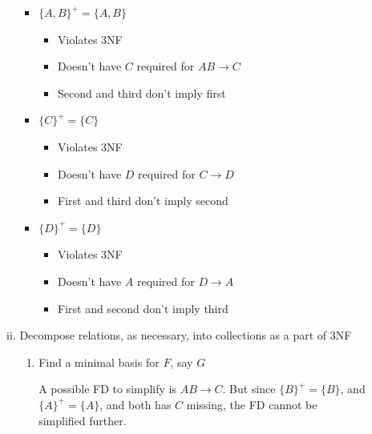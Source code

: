 \documentclass[12pt]{article}
\begin{document}
\begin{enumerate}[1.]
\begin{enumerate}[a)]
\begin{enumerate}[i)]
            \bigskip
            \color{red}
            \begin{itemize}
                \item $\{A,B\}^+ = \{A,B\}$
                \begin{itemize}
                    \item Violates 3NF
                    \item Doesn't have $C$ required for $AB \to C$
                    \item Second and third don't imply first
                \end{itemize}
                \item $\{C\}^+ = \{C\}$
                \begin{itemize}
                    \item Violates 3NF
                    \item Doesn't have $D$ required for $C \to D$
                    \item First and third don't imply second
                \end{itemize}
                \item $\{D\}^+ = \{D\}$
                \begin{itemize}
                    \item Violates 3NF
                    \item Doesn't have $A$ required for $D \to A$
                    \item First and second don't imply third
                \end{itemize}
            \end{itemize}

            \color{black}

            \item Decompose relations, as necessary, into collections as a part of 3NF

            \bigskip

            \begin{enumerate}[1.]
                \item Find a minimal basis for $F$, say $G$

                \bigskip

                \color{red}
                A possible FD to simplify is $AB \to C$. But since $\{B\}^+ = \{B\}$,
                and $\{A\}^+ = \{A\}$, and both has $C$ missing, the FD cannot be
                simplified further.


\end{enumerate}
\end{enumerate}
\end{enumerate}
\end{enumerate}
\end{document}
